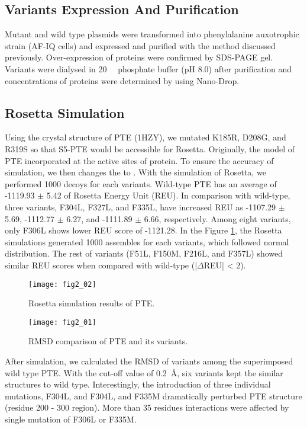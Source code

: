 \begin{refsection}
\subsection{Variants Expression And Purification}

Mutant and wild type plasmids were transformed into 
phenylalanine auxotrophic strain (AF-IQ cells) and expressed and purified with
the method discussed  previously.\cite{Yang2014a} Over-expression of proteins
were confirmed by SDS-PAGE gel. Variants were dialysed in \SI{20}{\milli\Molar}
phosphate buffer (pH 8.0) after purification and concentrations of proteins
were determined by using Nano-Drop.

\subsection{Rosetta Simulation}

Using the crystal structure of PTE (1HZY), we mutated K185R, D208G, and R319S
so that S5-PTE would be accessible for Rosetta. Originally, the model of PTE
incorporated  at the active sites of protein. To ensure the accuracy
of simulation, we then changes the  to . With the
simulation of Rosetta, we performed 1000 decoys for each variants.  Wild-type
PTE has an average of -1119.93 $\pm$ 5.42 of Rosetta Energy Unit (REU). In
comparison with wild-type, three variants, F304L, F327L, and F335L, have
increased REU as -1107.29 $\pm$ 5.69, -1112.77 $\pm$ 6.27, and -1111.89 $\pm$
6.66, respectively. Among eight variants, only F306L shows lower REU score of
-1121.28. In the Figure \ref{fig:rosetta-pte-chap2}, the Rosetta simulations
generated 1000 assembles for each variants, which followed normal distribution.
The rest of variants (F51L, F150M, F216L, and F357L) showed similar REU scores
when compared with wild-type (|$\Delta$REU| < 2). 

\begin{figure}[h!] \centering \texttt{[image: fig2\_02]}
    \caption[Rosetta simulation results of PTE.]{Rosetta simulation results of PTE.}
    \label{fig:rosetta-pte-chap2}
\end{figure}
\begin{figure}[h!] \centering \texttt{[image: fig2\_01]}
    \caption[RMSD comparison of PTE and its variants.]{RMSD comparison of PTE
    and its variants.} 
    \label{fig:rmsd-pte-chap2}
\end{figure}
After simulation, we calculated the RMSD of variants among the superimposed
wild type PTE. With the cut-off value of \SI{0.2}{\angstrom}, six variants kept the
similar structures to wild type. Interestingly, the introduction of three
individual mutations, F304L, and F304L, and F335M dramatically perturbed PTE
structure (residue 200 - 300 region). More than 35 residues interactions were
affected by single mutation of F306L or F335M. 


\end{refsection}
